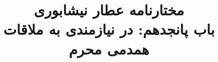 \documentclass[14pt,b5paper]{article}
\begin{document}
\title{\Huge مختارنامه عطار نیشابوری \\
باب پانجدهم: در نیازمندی به ملاقات همدمی محرم}
\author{ }
\date{ }
\maketitle
\newpage
\tableofcontents
\newpage

\newpage

\newpage

\newpage

\newpage

\newpage

\newpage

\newpage

\newpage

\newpage

\newpage

\newpage

\newpage

\newpage

\newpage

\newpage

\newpage

\newpage

\newpage

\newpage

\newpage

\newpage

\newpage

\newpage
\end{document}
